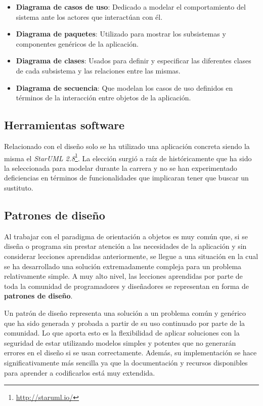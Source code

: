 \begin{itemize}
	\item \textbf{Diagrama de casos de uso}: Dedicado a modelar el comportamiento del sistema ante los actores que interactúan con él.
	\item \textbf{Diagrama de paquetes}: Utilizado para mostrar los subsistemas y componentes genéricos de la aplicación.
	\item \textbf{Diagrama de clases}: Usados para definir y especificar las diferentes clases de cada subsistema y las relaciones entre las mismas.
	\item \textbf{Diagrama de secuencia}: Que modelan los casos de uso definidos en términos de la interacción entre objetos de la aplicación.
\end{itemize}

\subsection{Herramientas software}

Relacionado con el diseño solo se ha utilizado una aplicación concreta siendo la misma el \textit{StarUML 2.8}\footnote{\url{http://staruml.io/}}. La elección surgió a raíz de históricamente que ha sido la seleccionada para modelar durante la carrera y no se han experimentado deficiencias en términos de funcionalidades que implicaran tener que buscar un sustituto.

\subsection{Patrones de diseño}

Al trabajar con el paradigma de orientación a objetos es muy común que, si se diseña o programa sin prestar atención a las necesidades de la aplicación y sin considerar lecciones aprendidas anteriormente, se llegue a una situación en la cual se ha desarrollado una solución extremadamente compleja para un problema relativamente simple. A muy alto nivel, las lecciones aprendidas por parte de toda la comunidad de programadores y diseñadores se representan en forma de \textbf{patrones de diseño}.

\bigskip

Un patrón de diseño representa una solución a un problema común y genérico que ha sido generada y probada a partir de su uso continuado por parte de la comunidad. Lo que aporta esto es la flexibilidad de aplicar soluciones con la seguridad de estar utilizando modelos simples y potentes que no generarán errores en el diseño si se usan correctamente. Además, su implementación se hace significativamente más sencilla ya que la documentación y recursos disponibles para aprender a codificarlos está muy extendida.

